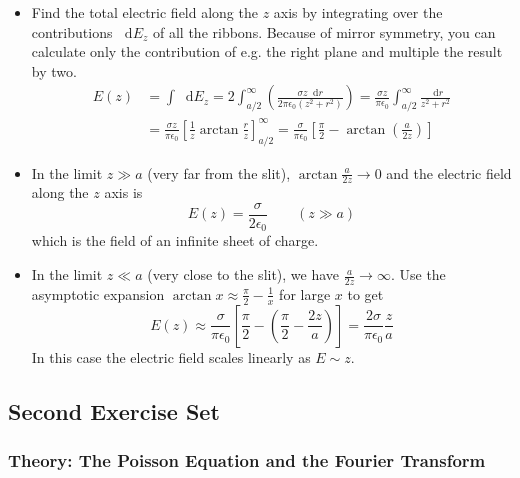 \documentclass[11pt, a4paper]{article}
\newcommand{\diff}{\mathop{}\!\mathrm{d}} %
\newcommand{\ee}{\epsilon_{0}}  %
\begin{document}
\begin{itemize}
	\item Find the total electric field along the $ z $ axis by integrating over the contributions $ \diff E_{z} $ of all the ribbons. Because of mirror symmetry, you can calculate only the contribution of e.g. the right plane and multiple the result by two.
	\begin{align*}
		E(z) &= \int \diff E_{z} = 2 \int_{a/2}^{\infty} \left(\frac{\sigma z \diff r}{2\pi \ee (z^{2} + r^{2})}\right) = \frac{\sigma z}{\pi \ee} \int_{a/2}^{\infty} \frac{\diff r}{z^{2} + r^{2}}\\
		&= \frac{\sigma z}{\pi \ee} \left[\frac{1}{z}\arctan \frac{r}{z}\right]_{a/2}^{\infty} = \frac{\sigma}{\pi \ee} \left[\frac{\pi}{2} - \arctan(\frac{a}{2z})\right]
	\end{align*}
	
	\item In the limit $ z \gg a $ (very far from the slit), $ \arctan\frac{a}{2z} \to 0 $ and the electric field along the $ z $ axis is 
	\begin{equation*}
		E(z) = \frac{\sigma}{2 \ee} \qquad (z \gg a)
	\end{equation*}
	which is the field of an infinite sheet of charge.
	
	\item In the limit $ z \ll a $ (very close to the slit), we have $ \frac{a}{2z} \to \infty $. Use the asymptotic expansion $ \arctan x \approx \frac{\pi}{2} - \frac{1}{x} $ for large $ x $ to get
	\begin{equation*}
		E(z) \approx \frac{\sigma}{\pi \ee} \left[\frac{\pi}{2} - \left(\frac{\pi}{2} - \frac{2z}{a}\right)\right] = \frac{2\sigma}{\pi \ee} \frac{z}{a}
	\end{equation*}
	In this case the electric field scales linearly as $ E \sim z $. 
\end{itemize} 


\subsection{Second Exercise Set}
\subsubsection{Theory: The Poisson Equation and the Fourier Transform}
\end{document}
